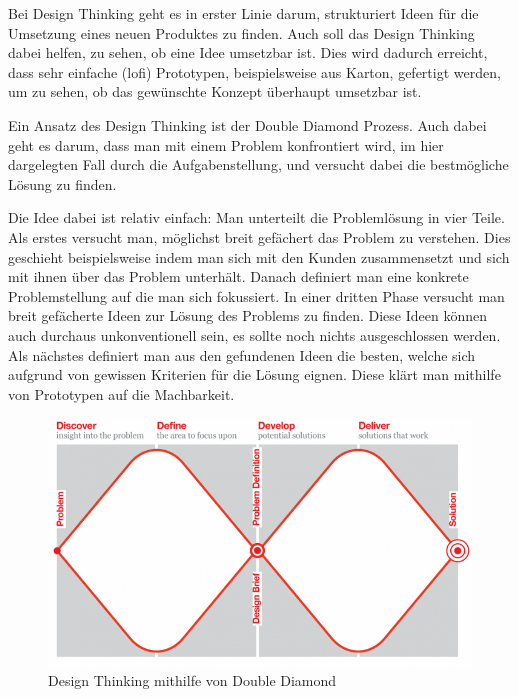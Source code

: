 Bei Design Thinking \cite{Wikipedia-Design-Thinking} geht es in erster Linie darum, strukturiert 
Ideen für die Umsetzung eines neuen Produktes zu finden. Auch soll das Design Thinking
dabei helfen, zu sehen, ob eine Idee umsetzbar ist. Dies wird dadurch erreicht,
dass sehr einfache (\acrshort{lofi}) Prototypen, beispielsweise aus Karton, 
gefertigt werden, um zu sehen, ob das gewünschte Konzept überhaupt umsetzbar ist.

Ein Ansatz des Design Thinking ist der Double Diamond Prozess. Auch dabei geht es
darum, dass man mit einem Problem konfrontiert wird, im hier dargelegten Fall durch die 
Aufgabenstellung, und versucht dabei die bestmögliche Lösung zu finden.

Die Idee dabei ist relativ einfach: Man unterteilt die Problemlösung in vier Teile.
Als erstes versucht man, möglichst breit gefächert das Problem zu verstehen. Dies geschieht
beispielsweise indem man sich mit den Kunden zusammensetzt und sich mit ihnen über das Problem unterhält.
Danach definiert man eine konkrete Problemstellung auf die man sich fokussiert.
In einer dritten Phase versucht man breit gefächerte Ideen zur Lösung des Problems zu finden.
Diese Ideen können auch durchaus unkonventionell sein, es sollte noch nichts ausgeschlossen werden.
Als nächstes definiert man aus den gefundenen Ideen
die besten, welche sich aufgrund von gewissen Kriterien für die Lösung eignen.
Diese klärt man mithilfe von Prototypen auf die Machbarkeit.
\begin{figure}[H]
  \includegraphics[width=1.0\textwidth]{img/Aufgabenstellung/double-diamond.png}
  \centering
  \caption{Design Thinking mithilfe von Double Diamond}
\end{figure}
  
